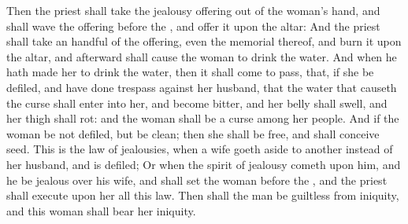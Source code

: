 \begin{biblechapter}
\verse Then the priest shall take the jealousy offering out of the woman's hand, and shall wave the offering before the \LORD, and offer it upon the altar:
\verse And the priest shall take an handful of the offering, even the memorial thereof, and burn it upon the altar, and afterward shall cause the woman to drink the water.
\verse And when he hath made her to drink the water, then it shall come to pass, that, if she be defiled, and have done trespass against her husband, that the water that causeth the curse shall enter into her, and become bitter, and her belly shall swell, and her thigh shall rot: and the woman shall be a curse among her people.
\verse And if the woman be not defiled, but be clean; then she shall be free, and shall conceive seed.
\verse This is the law of jealousies, when a wife goeth aside to another instead of her husband, and is defiled;
\verse Or when the spirit of jealousy cometh upon him, and he be jealous over his wife, and shall set the woman before the \LORD, and the priest shall execute upon her all this law.
\verse Then shall the man be guiltless from iniquity, and this woman shall bear her iniquity.
\end{biblechapter}


